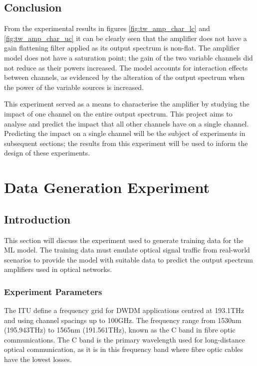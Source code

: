 \subsection{Conclusion}
From the experimental results in figures \ref{fig:tw_amp_char_lc} and \ref{fig:tw_amp_char_uc} it can be clearly seen that the amplifier does not have a gain flattening filter applied as its output spectrum is non-flat. The amplifier model does not have a saturation point; the gain of the two variable channels did not reduce as their powers increased. The model accounts for interaction effects between channels, as evidenced by the alteration of the output spectrum when the power of the variable sources is increased.

This experiment served as a means to characterise the amplifier by studying the impact of one channel on the entire output spectrum. This project aims to analyse and predict the impact that all other channels have on a single channel. Predicting the impact on a single channel will be the subject of experiments in subsequent sections; the results from this experiment will be used to inform the design of these experiments.




\FloatBarrier
\section{Data Generation Experiment} \label{tw:sec:data_gen}


\subsection{Introduction}

This section will discuss the experiment used to generate training data for the ML model. The training data must emulate optical signal traffic from real-world scenarios to provide the model with suitable data to predict the output spectrum amplifiers used in optical networks.


\subsubsection{Experiment Parameters}

The ITU define a frequency grid for DWDM applications centred at 193.1THz and using channel spacings up to 100GHz. The frequency range from 1530nm (195.943THz) to 1565nm (191.561THz), known as the C band in fibre optic communications. The C band is the primary wavelength used for long-distance optical communication, as it is in this frequency band where fibre optic cables have the lowest losses. 

